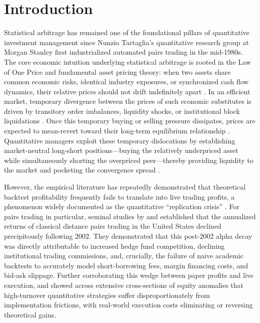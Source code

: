 \documentclass[11pt,a4paper]{article}
\begin{document}
\newpage
\tableofcontents
\newpage


\section{Introduction}
\label{sec:intro}

Statistical arbitrage has remained one of the foundational pillars of quantitative investment management since Nunzio Tartaglia's quantitative research group at Morgan Stanley first industrialized automated pairs trading in the mid-1980s. The core economic intuition underlying statistical arbitrage is rooted in the Law of One Price and fundamental asset pricing theory: when two assets share common economic risks, identical industry exposures, or synchronized cash flow dynamics, their relative prices should not drift indefinitely apart \citep{gatev2006pairs,vidyamurthy2004pairs}. In an efficient market, temporary divergence between the prices of such economic substitutes is driven by transitory order imbalances, liquidity shocks, or institutional block liquidations \citep{campbell1993trading,chordia2000trading}. Once this temporary buying or selling pressure dissipates, prices are expected to mean-revert toward their long-term equilibrium relationship \citep{avellaneda2010statistical,krauss2017statistical}. Quantitative managers exploit these temporary dislocations by establishing market-neutral long-short positions---buying the relatively underpriced asset while simultaneously shorting the overpriced peer---thereby providing liquidity to the market and pocketing the convergence spread \citep{gu2020empirical}.

However, the empirical literature has repeatedly demonstrated that theoretical backtest profitability frequently fails to translate into live trading profits, a phenomenon widely documented as the quantitative ``replication crisis'' \citep{mclean2016does,hou2020replicating,harvey2016and}. For pairs trading in particular, seminal studies by \citet{do2010does} and \citet{do2012are} established that the annualized returns of classical distance pairs trading in the United States declined precipitously following 2002. They demonstrated that this post-2002 alpha decay was directly attributable to increased hedge fund competition, declining institutional trading commissions, and, crucially, the failure of naive academic backtests to accurately model short-borrowing fees, margin financing costs, and bid-ask slippage. Further corroborating this wedge between paper profits and live execution, \citet{novymarx2016taxonomy} and \citet{frazzini2018trading} showed across extensive cross-sections of equity anomalies that high-turnover quantitative strategies suffer disproportionately from implementation frictions, with real-world execution costs eliminating or reversing theoretical gains.
\end{document}

